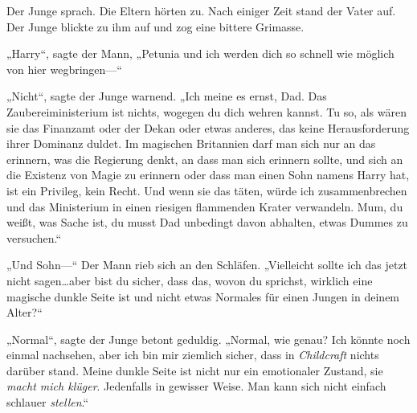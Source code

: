 
Der Junge sprach. Die Eltern hörten zu. Nach einiger Zeit stand der Vater auf. Der Junge blickte zu ihm auf und zog eine bittere Grimasse.

„Harry“, sagte der Mann, „Petunia und ich werden dich so schnell wie möglich von hier wegbringen—“

„Nicht“, sagte der Junge warnend. „Ich meine es ernst, Dad. Das Zaubereiministerium ist nichts, wogegen du dich wehren kannst. Tu so, als wären sie das Finanzamt oder der Dekan oder etwas anderes, das keine Herausforderung ihrer Dominanz duldet. Im magischen Britannien darf man sich nur an das erinnern, was die Regierung denkt, an dass man sich erinnern sollte, und sich an die Existenz von Magie zu erinnern oder dass man einen Sohn namens Harry hat, ist ein Privileg, kein Recht. Und wenn sie das täten, würde ich zusammenbrechen und das Ministerium in einen riesigen flammenden Krater verwandeln. Mum, du weißt, was Sache ist, du musst Dad unbedingt davon abhalten, etwas Dummes zu versuchen.“

„Und Sohn—“
Der Mann rieb sich an den Schläfen.
„Vielleicht sollte ich das jetzt nicht sagen…aber bist du sicher, dass das, wovon du sprichst, wirklich eine magische dunkle Seite ist und nicht etwas Normales für einen Jungen in deinem Alter?“

„Normal“, sagte der Junge betont geduldig. „Normal, wie genau? Ich könnte noch einmal nachsehen, aber ich bin mir ziemlich sicher, dass in \emph{Childcraft} nichts darüber stand. Meine dunkle Seite ist nicht nur ein emotionaler Zustand, sie \emph{macht mich klüger}. Jedenfalls in gewisser Weise. Man kann sich nicht einfach schlauer \emph{stellen}.“


